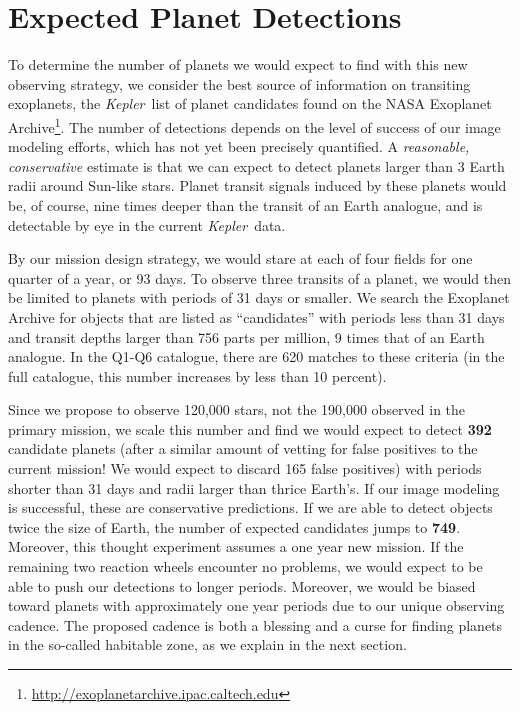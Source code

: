 \documentclass[12pt, preprint]{aastex}
\newcommand{\observatory}[1]{\textsl{#1}}
\newcommand{\kepler}{\observatory{Kepler}}
\newcommand{\Kepler}{\kepler}
\begin{document}
 



\section{Expected Planet Detections}
\label{Haul}
To determine the number of planets we would expect to find with this new 
 observing strategy, we consider the best source of information on transiting 
 exoplanets, the \Kepler\ list of planet candidates found on the NASA 
 Exoplanet Archive\footnote{\url{http://exoplanetarchive.ipac.caltech.edu}}.
The number of detections depends on the level of success of our image modeling
 efforts, which has not yet been precisely quantified. 
A \textit{reasonable, conservative} estimate is that we can expect to detect 
 planets larger than 3 Earth radii around Sun-like stars. 
Planet transit signals induced by these planets would be, of course, nine times
 deeper than the transit of an Earth analogue, and is detectable by eye in the 
 current \Kepler\ data. 

By our mission design strategy, we would stare at each of four fields for one 
 quarter of a year, or 93 days. 
To observe three transits of a planet, we would then be limited to planets with 
 periods of 31 days or smaller. 
We search the Exoplanet Archive for objects that are listed as ``candidates'' 
 with periods less than 31 days and transit depths larger than 756 parts per 
 million, 9 times that of an Earth analogue. 
In the Q1-Q6 catalogue, there are 620 matches to these criteria (in the full 
 catalogue, this number increases by less than 10 percent). 
 
Since we propose to observe 120,000 stars, not the 190,000 observed in the 
 primary mission, we scale this number and find we would expect to detect 
 \textbf{392} candidate planets (after a similar amount of vetting for false 
 positives to the current mission! We would expect to discard 165
 false positives) with periods shorter than 31 days and 
 radii larger than thrice Earth's. 
If our image modeling is successful, these are conservative predictions.
If we are able to detect objects twice the size of Earth, the number of 
 expected candidates jumps to \textbf{749}.
Moreover, this thought experiment assumes a one year new mission. 
If the  remaining two reaction wheels encounter no problems, we would expect 
 to be able to push our detections to longer periods. 
Moreover, we would be biased toward planets with approximately one year periods
 due to our unique observing cadence. 
The proposed cadence is both a blessing and a curse for finding planets in the 
 so-called habitable zone, as we explain in the next section.
 
\end{document}
